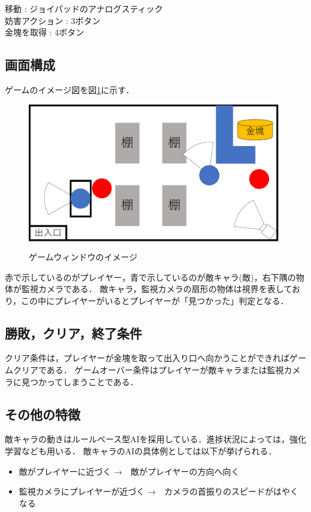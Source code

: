 \documentclass{jarticle}
\begin{document}
移動 : ジョイパッドのアナログスティック\\
妨害アクション : 3ボタン\\
金塊を取得 : 4ボタン\\


\subsection{画面構成}
ゲームのイメージ図を図\ref{fig:gameimg}に示す．

\begin{figure}[H]
\begin{center}
\includegraphics[width=\linewidth]{./zu/gamewindow.png}
\caption{ゲームウィンドウのイメージ}
\label{fig:gameimg}
\end{center}
\end{figure}

赤で示しているのがプレイヤー，青で示しているのが敵キャラ(敵)，右下隅の物体が監視カメラである．
敵キャラ，監視カメラの扇形の物体は視界を表しており，この中にプレイヤーがいるとプレイヤーが「見つかった」判定となる．

\subsection{勝敗，クリア，終了条件}
クリア条件は，プレイヤーが金塊を取って出入り口へ向かうことができればゲームクリアである．
ゲームオーバー条件はプレイヤーが敵キャラまたは監視カメラに見つかってしまうことである．

\subsection{その他の特徴}
敵キャラの動きはルールベース型AIを採用している．進捗状況によっては，強化学習なども用いる．
敵キャラのAIの具体例としては以下が挙げられる．
\begin{itemize}
\item 敵がプレイヤーに近づく →　敵がプレイヤーの方向へ向く
\item 監視カメラにプレイヤーが近づく →　カメラの首振りのスピードがはやくなる
\end{itemize}
\end{document}
